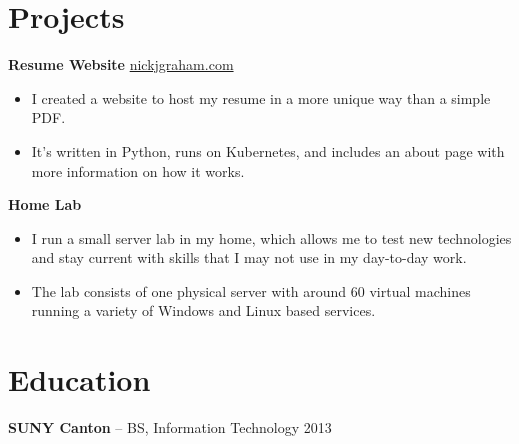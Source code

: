 \documentclass[11pt]{article}       %
\begin{document}
\vspace{-18.5pt}

\section*{Projects}

\textbf{Resume Website} \hfill \href{https://nickjgraham.com}{nickjgraham.com} \\
\vspace{-9pt}
\begin{itemize}
  
  \item I created a website to host my resume in a more unique way than a simple PDF.
  
  \item It's written in Python, runs on Kubernetes, and includes an about page with more information on how it works.
  
\end{itemize}

\textbf{Home Lab} \hfill  \\
\vspace{-9pt}
\begin{itemize}
  
  \item I run a small server lab in my home, which allows me to test new technologies and stay current with skills that I may not use in my day-to-day work.
  
  \item The lab consists of one physical server with around 60 virtual machines running a variety of Windows and Linux based services.
  
\end{itemize}


\vspace{-18.5pt}

\section*{Education}

\textbf{SUNY Canton} -- BS, Information Technology \hfill 2013 \\
\end{document}
